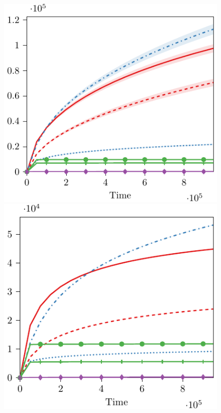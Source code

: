 \begin{figure}
\begin{minipage}{0.25\linewidth}
    \includegraphics[width=0.85\linewidth]{sections/appendix/nips2020-bandits/images/attack_reward/jester/cost_attack_reward_jester.pdf}
    \end{minipage}\hfill
    \begin{minipage}{0.25\linewidth}
    \centering
    \includegraphics[width=0.85\linewidth]{sections/appendix/nips2020-bandits/images/attack_reward/movielens/cost_reward_attack_movielens.pdf}
    \end{minipage}\\
    \begin{minipage}{0.25\linewidth}

\end{minipage}
\end{figure}

